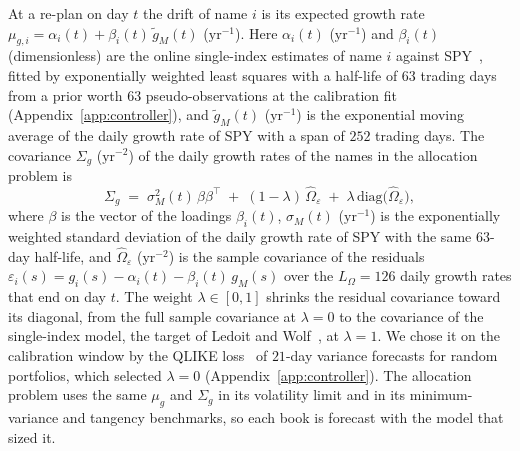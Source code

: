 At a re-plan on day $t$ the drift of name $i$ is its expected growth rate
$\mu_{g,i} = \alpha_i(t) + \beta_i(t)\,\tilde g_M(t)$ ($\mathrm{yr}^{-1}$). Here $\alpha_i(t)$ ($\mathrm{yr}^{-1}$)
and $\beta_i(t)$ (dimensionless) are the online single-index estimates of name $i$ against SPY~\cite{sharpe1963},
fitted by exponentially weighted least squares with a half-life of $63$ trading days from a prior worth $63$
pseudo-observations at the calibration fit (Appendix~\ref{app:controller}), and $\tilde g_M(t)$
($\mathrm{yr}^{-1}$) is the exponential moving average of the daily growth rate of SPY with a span of $252$ trading
days. The covariance $\Sigma_g$ ($\mathrm{yr}^{-2}$) of the daily growth rates of the names in the allocation
problem is
\begin{equation}
  \Sigma_g \;=\; \sigma_M^2(t)\,\beta\beta^{\top} \;+\; (1-\lambda)\,\hat\Omega_\varepsilon
  \;+\; \lambda\,\mathrm{diag}\big(\hat\Omega_\varepsilon\big),
  \label{eq:mpc-cov}
\end{equation}
where $\beta$ is the vector of the loadings $\beta_i(t)$, $\sigma_M(t)$ ($\mathrm{yr}^{-1}$) is the exponentially
weighted standard deviation of the daily growth rate of SPY with the same $63$-day half-life, and
$\hat\Omega_\varepsilon$ ($\mathrm{yr}^{-2}$) is the sample covariance of the residuals
$\varepsilon_i(s) = g_i(s) - \alpha_i(t) - \beta_i(t)\,g_M(s)$ over the $L_\Omega = 126$ daily growth rates that
end on day $t$. The weight $\lambda \in [0, 1]$ shrinks the residual covariance toward its diagonal, from the full
sample covariance at $\lambda = 0$ to the covariance of the single-index model, the target of Ledoit and
Wolf~\cite{ledoitWolf2003}, at $\lambda = 1$. We chose it on the calibration window by the QLIKE
loss~\cite{patton2011} of $21$-day variance forecasts for random portfolios, which selected $\lambda = 0$
(Appendix~\ref{app:controller}). The allocation problem uses the same $\mu_g$ and $\Sigma_g$ in its volatility limit
and in its minimum-variance and tangency benchmarks, so each book is forecast with the model that sized it.

